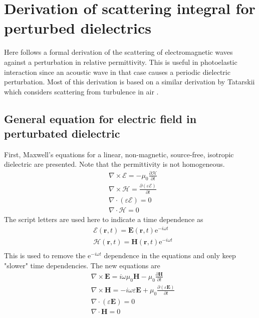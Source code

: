 \documentclass[10pt,a4paper]{eitExjobb}
\begin{document}
	\section{Derivation of scattering integral for perturbed dielectrics \label{app:scatterint}}
	Here follows a formal derivation of the scattering of electromagnetic waves against a perturbation in relative permittivity. This is useful in photoelastic interaction since an acoustic wave in that case causes a periodic dielectric perturbation. Most of this derivation is based on a similar derivation by Tatarskii which considers scattering from turbulence in air \cite{Tatarskii1971}.
	
	\subsection{General equation for electric field in perturbated dielectric}
	First, Maxwell's equations for a linear, non-magnetic, source-free, isotropic dielectric are presented. Note that the permittivity is not homogeneous.
	\begin{align*}
	&\nabla \times \bm{\mathcal{E}} = -\mu_0 \frac{\partial \bm{\mathcal{H}}}{\partial t} \\
	&\nabla \times \bm{\mathcal{H}} = \frac{\partial (\varepsilon \bm{\mathcal{E}})}{\partial t} \\
	&\nabla \cdot (\varepsilon \bm{\mathcal{E}}) = 0 \\
	&\nabla \cdot \bm{\mathcal{H}} = 0
	\end{align*}
	The script letters are used here to indicate a time dependence as
	\begin{align*}
	&\bm{\mathcal{E}}(\bm{r},t) = \bm{E}(\bm{r},t) \text{e}^{-i\omega t} \\
	&\bm{\mathcal{H}}(\bm{r},t) = \bm{H}(\bm{r},t) \text{e}^{-i\omega t} \\
	\end{align*}
	This is used to remove the e$^{-i\omega t}$ dependence in the equations and only keep "slower" time dependencies. The new equations are
	\begin{align*}
	&\nabla \times \bm{E} = i\omega \mu_0 \bm{H} - \mu_0 \frac{\partial \bm{H}}{\partial t} \\
	&\nabla \times \bm{H} = -i\omega \varepsilon \bm{E} + \mu_0 \frac{\partial (\varepsilon \bm{E})}{\partial t} \\
	&\nabla \cdot (\varepsilon \bm{E}) = 0 \\
	&\nabla \cdot \bm{H} = 0
	\end{align*}
\end{document}
